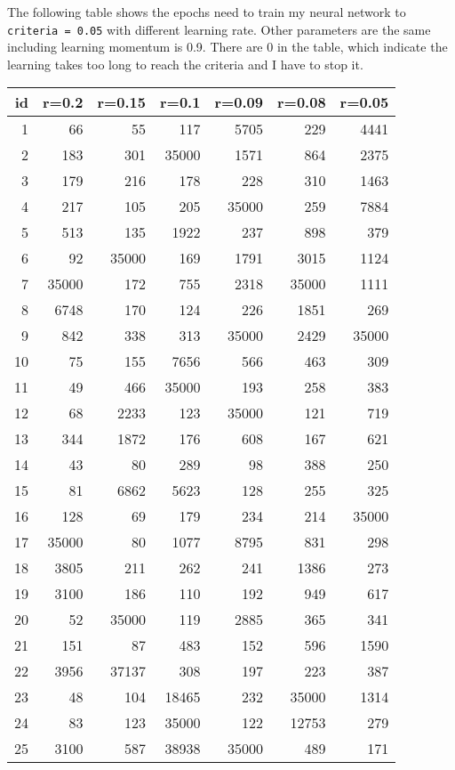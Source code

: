 \documentclass[11pt]{article}
\begin{document}
The following table shows the epochs need to train my neural network to \texttt{criteria = 0.05} with different learning rate. Other parameters are the same including learning momentum is 0.9. There are 0 in the table, which indicate the learning takes too long to reach the criteria and I have to stop it.

\begin{center}
\begin{tabular}{rrrrrrr}
id & r=0.2 & r=0.15 & r=0.1 & r=0.09 & r=0.08 & r=0.05\\
\hline
1 & 66 & 55 & 117 & 5705 & 229 & 4441\\
2 & 183 & 301 & 35000 & 1571 & 864 & 2375\\
3 & 179 & 216 & 178 & 228 & 310 & 1463\\
4 & 217 & 105 & 205 & 35000 & 259 & 7884\\
5 & 513 & 135 & 1922 & 237 & 898 & 379\\
6 & 92 & 35000 & 169 & 1791 & 3015 & 1124\\
7 & 35000 & 172 & 755 & 2318 & 35000 & 1111\\
8 & 6748 & 170 & 124 & 226 & 1851 & 269\\
9 & 842 & 338 & 313 & 35000 & 2429 & 35000\\
10 & 75 & 155 & 7656 & 566 & 463 & 309\\
11 & 49 & 466 & 35000 & 193 & 258 & 383\\
12 & 68 & 2233 & 123 & 35000 & 121 & 719\\
13 & 344 & 1872 & 176 & 608 & 167 & 621\\
14 & 43 & 80 & 289 & 98 & 388 & 250\\
15 & 81 & 6862 & 5623 & 128 & 255 & 325\\
16 & 128 & 69 & 179 & 234 & 214 & 35000\\
17 & 35000 & 80 & 1077 & 8795 & 831 & 298\\
18 & 3805 & 211 & 262 & 241 & 1386 & 273\\
19 & 3100 & 186 & 110 & 192 & 949 & 617\\
20 & 52 & 35000 & 119 & 2885 & 365 & 341\\
21 & 151 & 87 & 483 & 152 & 596 & 1590\\
22 & 3956 & 37137 & 308 & 197 & 223 & 387\\
23 & 48 & 104 & 18465 & 232 & 35000 & 1314\\
24 & 83 & 123 & 35000 & 122 & 12753 & 279\\
25 & 3100 & 587 & 38938 & 35000 & 489 & 171\\

\end{tabular}
\end{center}
\end{document}
